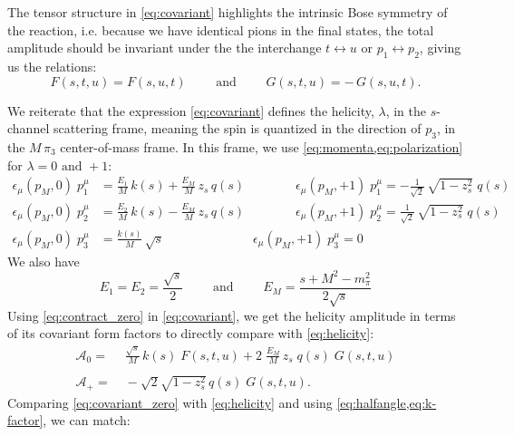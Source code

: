 \documentclass[10pt, aps,prd,amsmath,amssymb,superscriptaddress,onecolumn,
nofootinbib,showpacs,preprintnumbers]{revtex4-1}
\newcommand{\mand}{\qquad \text{ and } \qquad}
\begin{document}
 The  tensor structure in \cref{eq:covariant} highlights the intrinsic Bose symmetry of the reaction, i.e. because we have identical pions in the final states, the total amplitude should be invariant under the the interchange \(t \leftrightarrow u \) or \(p_1 \leftrightarrow p_2\), giving us the relations:
   \begin{equation}
     F(s,t,u) = F(s,u,t) \qquad \text{ and } \qquad G(s,t,u) = - \, G(s,u,t).
   \end{equation}

 We reiterate that the expression \cref{eq:covariant} defines the helicity, \(\lambda\), in the \(s\)-channel scattering frame, meaning the spin is quantized in the direction of \(p_3\), in the \(M \, \pi_3\) center-of-mass frame.
 In this frame, we use \cref{eq:momenta,eq:polarization} for \(\lambda = 0 \text{ and } +1 \):
   \begin{align}
     \label{eq:contract_zero}
     \epsilon_\mu(p_M,0) \; p_1^\mu &= \frac{E_1}{M} \, k(s) + \frac{E_M}{M} \,  z_s \, q(s)
     \qquad \qquad \epsilon_\mu(p_M,+1) \; p_1^\mu = - \frac{1}{\sqrt{2}} \, \sqrt{1 - z_s^2} \; q(s) \nonumber \\
     \epsilon_\mu(p_M,0) \; p_2^\mu &= \frac{E_2}{M} \, k(s) - \frac{E_M}{M} \,  z_s \, q(s)
     \qquad \qquad \epsilon_\mu(p_M,+1) \; p_2^\mu =  \frac{1}{\sqrt{2}} \, \sqrt{1 - z_s^2} \; q(s)  \\
     \epsilon_\mu(p_M,0) \; p_3^\mu &= \frac{k(s)}{M} \, \sqrt{s}
     \qquad \qquad \qquad \quad \epsilon_\mu(p_M,+1) \; p_3^\mu = 0 \nonumber
   \end{align}
 We also have
   \begin{equation}
     \label{eq:energies}
     E_1 = E_2 = \frac{\sqrt{s}}{2} \mand E_M = \frac{s + M^2 - m_\pi^2}{2 \sqrt{s}}
   \end{equation}
 Using \cref{eq:contract_zero} in \cref{eq:covariant}, we get the helicity amplitude in terms of its covariant form factors to directly compare with \cref{eq:helicity}:
  \begin{align}
   \label{eq:covariant_zero}
    \mathcal{A}_0 =& \; \frac{\sqrt{s}}{M} \, k(s) \; F(s,t,u) + 2 \; \frac{E_M}{M} \, z_s \; q(s) \; G(s,t,u) \\
    \nonumber \\
    \label{eq:covariant_plus}
    \mathcal{A}_+ =& \; - \sqrt{2} \sqrt{1-z_s^2} \, q(s) \; G(s,t,u).
  \end{align}
 Comparing \cref{eq:covariant_zero} with \cref{eq:helicity} and using \cref{eq:halfangle,eq:k-factor}, we can match:
\end{document}
